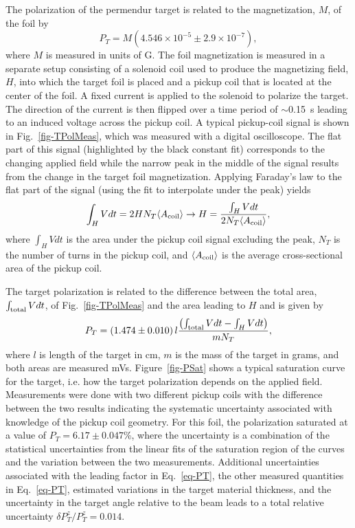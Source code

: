 The polarization of the permendur target is related to the magnetization, $M$, of the foil by~\cite{Band:1997ee} 
%
\begin{equation}
\label{eq-M2Pt2}
	P_T=M\left(4.546\times 10^{-5}\pm 2.9\times 10^{-7}\right),
\end{equation}
%
where $M$ is measured in units of G. The foil magnetization is measured in a separate setup consisting of a solenoid
coil used to produce the magnetizing field, $H$, into which the target foil is placed and a pickup coil that is located
at the center of the foil. A fixed current is applied to the solenoid to polarize the target. The direction of the
current is then flipped over a time period of $\sim$0.15~s leading to an induced voltage across the pickup coil. A
typical pickup-coil signal is shown in Fig.~\ref{fig-TPolMeas}, which was measured with a digital oscilloscope. The
flat part of this signal (highlighted by the black constant fit) corresponds to the changing applied field while the
narrow peak in the middle of the signal results from the change in the target foil magnetization. Applying Faraday's
law to the flat part of the signal (using the fit to interpolate under the peak) yields
%
\begin{equation}
\label{eq-H}
	\int_H  Vdt=2HN_T \langle A_{\rm coil}\rangle\rightarrow H=\frac{\int_H Vdt}{2N_T\langle A_{\rm coil}\rangle} ,
\end{equation}
%
where $\int_H Vdt$ is the area under the pickup coil signal excluding the peak, $N_T$ is the number of turns in the
pickup coil, and $\langle A_{\rm coil}\rangle$ is the average cross-sectional area of the pickup coil.

The target polarization is related to the difference between the total area, $\int_{\rm total} Vdt$, of
Fig.~\ref{fig-TPolMeas} and the area leading to $H$ and is given by \cite{Band:1997ee} 
%
\begin{equation}
\label{eq-PT}
	P_T=\left(1.474\pm0.010\right)l\frac{\left({\int_{\rm total} Vdt-\int_HVdt}\right)}{mN_T},
\end{equation}
%
where  $l$ is length of the target in cm, $m$ is the mass of the target in grams, and both areas are measured mVs. 
Figure~\ref{fig-PSat} shows a typical saturation curve for the target, i.e. how the target polarization depends on
the applied field. Measurements were done with two different pickup coils with the difference between the two
results indicating the systematic uncertainty associated with knowledge of the pickup coil geometry. For this foil,
the polarization saturated at a value of $P_T=6.17\pm 0.047$\%, where the uncertainty is a combination of the
statistical uncertainties from the linear fits of the saturation region of the curves and the variation between the
two measurements. Additional uncertainties associated with the leading factor in Eq.~\ref{eq-PT}, the other
measured quantities in Eq.~\ref{eq-PT}, estimated variations in the target material thickness, and the uncertainty
in the target angle relative to the beam leads to a total relative uncertainty $\delta P_T^z/P_T^z=0.014$.

